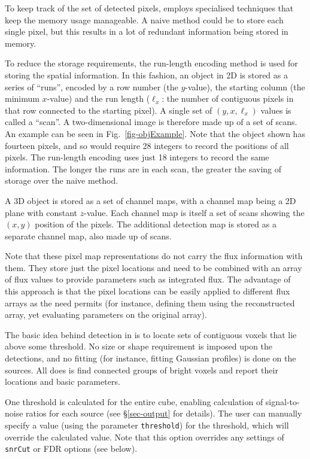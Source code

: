 To keep track of the set of detected pixels, \duchamp
employs specialised techniques that keep the memory usage
manageable. A naive method could be to store each single pixel, but
this results in a lot of redundant information being stored in memory.

To reduce the storage requirements, the run-length encoding method is
used for storing the spatial information. In this fashion, an object
in 2D is stored as a series of ``runs'', encoded by a row number (the
$y$-value), the starting column (the minimum $x$-value) and the run
length ($\ell_x$: the number of contiguous pixels in that row
connected to the starting pixel). A single set of $(y,x,\ell_x)$
values is called a ``scan''. A two-dimensional image is therefore made
up of a set of scans. An example can be seen in
Fig.~\ref{fig-objExample}. Note that the object shown has fourteen
pixels, and so would require 28 integers to record the positions of
all pixels. The run-length encoding uses just 18 integers to record
the same information. The longer the runs are in each scan, the
greater the saving of storage over the naive method.

A 3D object is stored as a set of channel maps, with a channel map
being a 2D plane with constant $z$-value. Each channel map is itself a
set of scans showing the $(x,y)$ position of the pixels. The
additional detection map is stored as a separate channel map, also
made up of scans.

Note that these pixel map representations do not carry the flux
information with them. They store just the pixel locations and need to
be combined with an array of flux values to provide parameters such as
integrated flux. The advantage of this approach is that the pixel
locations can be easily applied to different flux arrays as the need
permits (for instance, defining them using the reconstructed array,
yet evaluating parameters on the original array).


The basic idea behind detection in \duchamp is to locate sets of
contiguous voxels that lie above some threshold. No size or shape
requirement is imposed upon the detections, and no fitting (for
instance, fitting Gaussian profiles) is done on the sources. All
\duchamp does is find connected groups of bright voxels and report
their locations and basic parameters.

One threshold is calculated for the entire cube, enabling calculation
of signal-to-noise ratios for each source (see
\S\ref{sec-output} for details). The user can manually specify a
value (using the parameter \texttt{threshold}) for the threshold,
which will override the calculated value. Note that this option
overrides any settings of \texttt{snrCut} or FDR options (see below).

